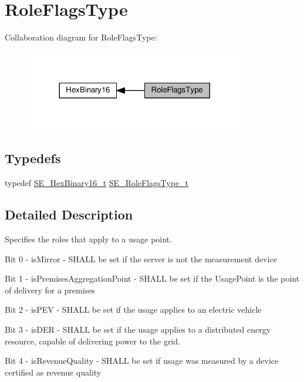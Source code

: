 \hypertarget{group__RoleFlagsType}{}\section{Role\+Flags\+Type}
\label{group__RoleFlagsType}
Collaboration diagram for Role\+Flags\+Type\+:\nopagebreak
\begin{figure}[H]
\begin{center}
\leavevmode
\includegraphics[width=272pt]{group__RoleFlagsType}
\end{center}
\end{figure}
\subsection*{Typedefs}
\begin{DoxyCompactItemize}
\item 
typedef \hyperlink{group__HexBinary16_gac040be0e918a360be6bcf5e8b8ad2c49}{S\+E\+\_\+\+Hex\+Binary16\+\_\+t} \hyperlink{group__RoleFlagsType_gac20b70bba5dd7d6773b13d69c372c957}{S\+E\+\_\+\+Role\+Flags\+Type\+\_\+t}
\end{DoxyCompactItemize}


\subsection{Detailed Description}
Specifies the roles that apply to a usage point.

Bit 0 -\/ is\+Mirror -\/ S\+H\+A\+LL be set if the server is not the measurement device

Bit 1 -\/ is\+Premises\+Aggregation\+Point -\/ S\+H\+A\+LL be set if the Usage\+Point is the point of delivery for a premises

Bit 2 -\/ is\+P\+EV -\/ S\+H\+A\+LL be set if the usage applies to an electric vehicle

Bit 3 -\/ is\+D\+ER -\/ S\+H\+A\+LL be set if the usage applies to a distributed energy resource, capable of delivering power to the grid.

Bit 4 -\/ is\+Revenue\+Quality -\/ S\+H\+A\+LL be set if usage was measured by a device certified as revenue quality

